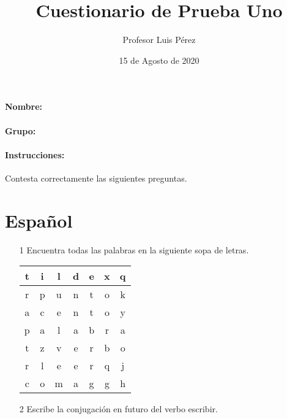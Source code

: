 \documentclass[12pt]{article}
\begin{document}
        \title{Cuestionario de Prueba Uno}
        \author{Profesor Luis Pérez}
        \date{15 de Agosto de 2020}
        \maketitle
        \paragraph{Nombre: }
        \paragraph{Grupo: }
        \paragraph{Instrucciones: }Contesta correctamente las siguientes preguntas.
    \section{Español}
    \begin{itemize}
        \item[1] Encuentra todas las palabras en la siguiente sopa de letras.
        \begin{center}
            \begin{tabular}{|c|c|c|c|c|c|c|}\hline
                t & i & l & d & e & x & q \\ \hline
                r & p & u & n & t & o & k \\ \hline
                a & c & e & n & t & o & y \\ \hline
                p & a & l & a & b & r & a \\ \hline
                t & z & v & e & r & b & o \\ \hline
                r & l & e & e & r & q & j \\ \hline
                c & o & m & a & g & g & h \\ \hline
            \end{tabular}
        \end{center}
        \item[2] Escribe la conjugación en futuro del verbo escribir.
        	\newline
        	\newline
        	\newline
        	\newline
        	\newline
        	\newline
        	\newline
    \end{itemize}
    \newpage
\end{document}
